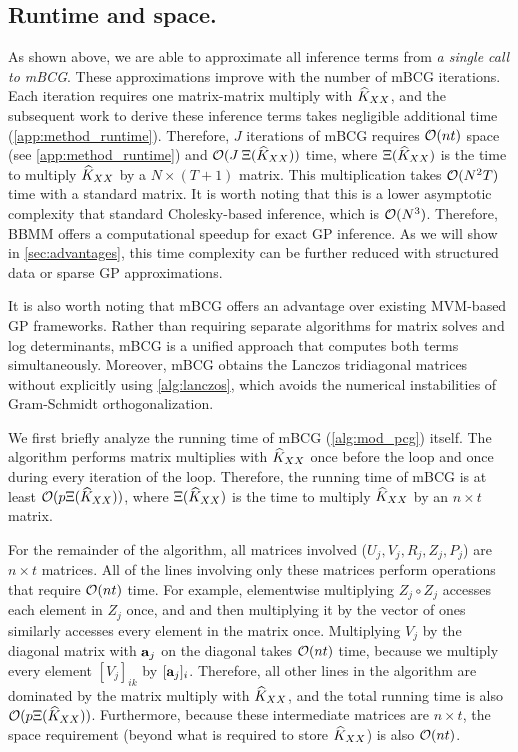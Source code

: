 \subsection{Runtime and space.}
As shown above, we are able to approximate all inference terms from \emph{a single call to mBCG}.
These approximations improve with the number of mBCG iterations.
Each iteration requires one matrix-matrix multiply with $\widehat{K}_{XX}$, and the subsequent work to derive these inference terms takes negligible additional time (\cref{app:method_runtime}).
Therefore, $J$ iterations of mBCG requires $\bigo{nt}$ space (see \cref{app:method_runtime}) and $\bigo{J \: \mmm{\trainK}}$ time,
where $\Xi (\widehat{K}_{XX})$ is the time to multiply $\widehat{K}_{XX}$ by a $N \times (T + 1)$ matrix.
This multiplication takes $\bigo{N^2 T}$ time with a standard matrix.
It is worth noting that this is a lower asymptotic complexity that standard Cholesky-based inference, which is $\bigo{N^3}$.
Therefore, BBMM offers a computational speedup for exact GP inference.
As we will show in \cref{sec:advantages}, this time complexity can be further reduced with structured data or sparse GP approximations.

It is also worth noting that mBCG offers an advantage over existing MVM-based GP frameworks.
Rather than requiring separate algorithms for matrix solves and log determinants, mBCG is a unified approach that computes both terms simultaneously.
Moreover, mBCG obtains the Lanczos tridiagonal matrices without explicitly using \cref{alg:lanczos}, which avoids the numerical instabilities of Gram-Schmidt orthogonalization.

We first briefly analyze the running time of mBCG (\autoref{alg:mod_pcg}) itself.
The algorithm performs matrix multiplies with $\widehat{K}_{XX}$ once before the loop and once during every iteration of the loop.
Therefore, the running time of mBCG is at least $\bigo{p\mmm{\trainK}}$, where $\Xi (\widehat{K}_{XX})$ is the time to multiply $\widehat{K}_{XX}$ by an $n \times t$ matrix.

For the remainder of the algorithm, all matrices involved ($U_{j},V_j,R_j,Z_j,P_j$) are $n \times t$ matrices.
All of the lines involving only these matrices perform operations that require $\bigo{nt}$ time.
For example, elementwise multiplying $Z_{j} \circ Z_{j}$ accesses each element in $Z_{j}$ once, and and then multiplying it by the vector of ones similarly accesses every element in the matrix once.
Multiplying $V_{j}$ by the diagonal matrix with $\mathbf{a}_{j}$ on the diagonal takes $\bigo{nt}$ time, because we multiply every element $[V_{j}]_{ik}$ by $[\mathbf{a}_{j}]_{i}$.
Therefore, all other lines in the algorithm are dominated by the matrix multiply with $\widehat{K}_{XX}$, and the total running time is also $\bigo{p\mmm{\trainK}}$.
Furthermore, because these intermediate matrices are $n \times t$, the space requirement (beyond what is required to store $\widehat{K}_{XX}$) is also $\bigo{nt}$.

